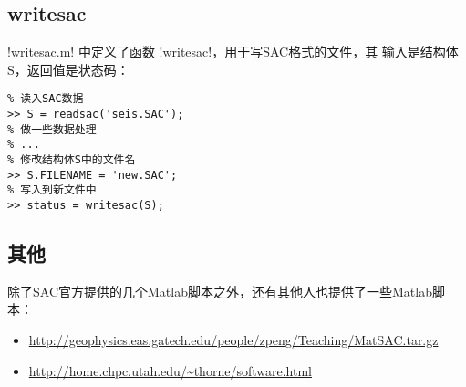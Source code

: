 \subsection{writesac}
!writesac.m! 中定义了函数 !writesac!，用于写SAC格式的文件，其
输入是结构体S，返回值是状态码：
\begin{verbatim}
% 读入SAC数据
>> S = readsac('seis.SAC');
% 做一些数据处理
% ...
% 修改结构体S中的文件名
>> S.FILENAME = 'new.SAC';
% 写入到新文件中
>> status = writesac(S);
\end{verbatim}

\subsection{其他}
除了SAC官方提供的几个Matlab脚本之外，还有其他人也提供了一些Matlab脚本：
\begin{itemize}
\item \url{http://geophysics.eas.gatech.edu/people/zpeng/Teaching/MatSAC.tar.gz}
\item \url{http://home.chpc.utah.edu/~thorne/software.html}
\end{itemize}
